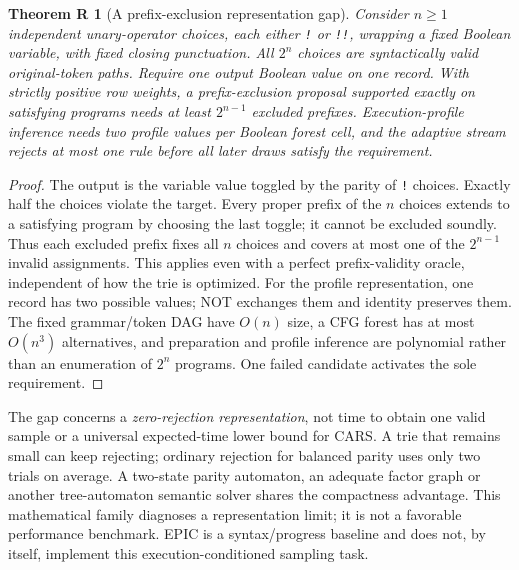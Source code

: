 \documentclass[11pt,a4paper]{article}
\newtheorem{refinement}{Theorem R}
\begin{document}
\begin{refinement}[A prefix-exclusion representation gap]
Consider $n\geq1$ independent unary-operator choices, each either
\texttt{!} or \texttt{!!}, wrapping a fixed Boolean variable, with fixed closing
punctuation. All $2^n$ choices are syntactically valid original-token paths.
Require one output Boolean value on one record. With strictly positive row
weights, a prefix-exclusion proposal supported exactly on satisfying programs
needs at least $2^{n-1}$ excluded prefixes. Execution-profile inference needs
two profile values per Boolean forest cell, and the adaptive stream rejects
at most one rule before all later draws satisfy the requirement.
\end{refinement}
\begin{proof}
The output is the variable value toggled by the parity of \texttt{!} choices.
Exactly half the choices violate the target. Every proper prefix of the $n$
choices extends to a satisfying program by choosing the last toggle; it cannot
be excluded soundly. Thus each excluded prefix fixes all $n$ choices and covers
at most one of the $2^{n-1}$ invalid assignments. This applies even with a
perfect prefix-validity oracle, independent of how the trie is optimized.
For the profile representation, one record has two possible values; NOT
exchanges them and identity preserves them. The fixed grammar/token DAG have
$O(n)$ size, a CFG forest has at most $O(n^3)$ alternatives, and preparation
and profile inference are polynomial rather than an enumeration of $2^n$
programs. One failed candidate activates the sole requirement.
\end{proof}

The gap concerns a \emph{zero-rejection representation}, not time to obtain
one valid sample or a universal expected-time lower bound for CARS. A trie
that remains small can keep rejecting; ordinary rejection for balanced parity
uses only two trials on average. A two-state parity automaton, an adequate
factor graph or another tree-automaton semantic solver shares the compactness
advantage. This mathematical family diagnoses a representation limit; it is
not a favorable performance benchmark. EPIC is a syntax/progress baseline
and does not, by itself, implement this execution-conditioned sampling task.
\end{document}
